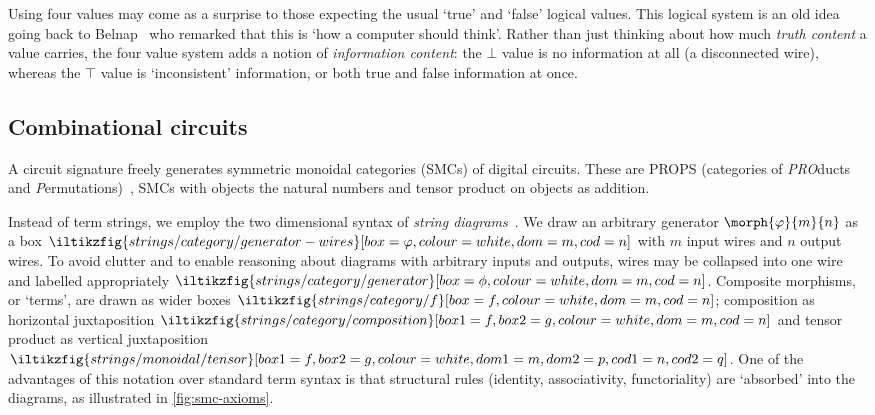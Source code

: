 \documentclass{lmcs}
\begin{document}
\begin{rem}
    Using four values may come as a surprise to those expecting the usual
    `true' and `false' logical values.
    This logical system is an old idea going back to
    Belnap~\cite{belnap1977useful} who remarked that this is `how a computer
    should think'.
    Rather than just thinking about how much \emph{truth content} a value
    carries, the four value system adds a notion of \emph{information content}:
    the \(\bot\) value is no information at all (a disconnected wire), whereas
    the \(\top\) value is `inconsistent' information, or both true and false
    information at once.
\end{rem}

\subsection{Combinational circuits}

A circuit signature freely generates symmetric monoidal categories (SMCs) of
digital circuits.
These are PROPS (categories of \emph{PRO}ducts and
\emph{P}ermutations)~\cite{maclane1965categorical}, SMCs with objects the
natural numbers and tensor product on objects as addition.

Instead of term strings, we employ the two dimensional syntax of
\emph{string diagrams}~\cite{joyal1991geometry,joyal1996traced,selinger2011survey}.
We draw an arbitrary generator \(\morph{\varphi}{m}{n}\) as a box \(
\iltikzfig{strings/category/generator-wires}[box=\varphi,colour=white,dom=m,cod=n]
\) with \(m\) input wires and \(n\) output wires.
To avoid clutter and to enable reasoning about diagrams with arbitrary
inputs and outputs, wires may be collapsed into one wire and labelled
appropriately \(
\iltikzfig{strings/category/generator}[box=\phi,colour=white,dom=m,cod=n]
\).
Composite morphisms, or `terms', are drawn as wider boxes \(
\iltikzfig{strings/category/f}[box=f,colour=white,dom=m,cod=n]
\); composition as horizontal juxtaposition \(
\iltikzfig{strings/category/composition}[box1=f,box2=g,colour=white,dom=m,cod=n]
\) and tensor product as vertical juxtaposition \(
\iltikzfig{strings/monoidal/tensor}[box1=f,box2=g,colour=white,dom1=m,dom2=p,cod1=n,cod2=q]
\).
One of the advantages of this notation over standard term syntax is that
structural rules (identity, associativity, functoriality) are `absorbed' into
the diagrams, as illustrated in \cref{fig:smc-axioms}.
\end{document}
